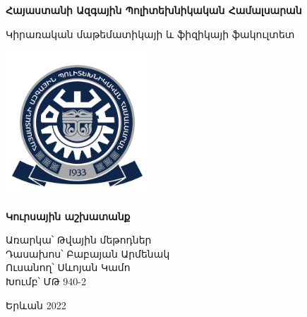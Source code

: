 \documentclass{article}
\begin{document}

\setmainfont{Arian AMU}

\begin{titlepage}
	\begin{center}
	
		\begin{LARGE}
		       \textbf{Հայաստանի Ազգային Պոլիտեխնիկական Համալսարան}
		\end{LARGE}
		
		       \vspace{0.5cm}
		
		\begin{Large}
		        Կիրառական մաթեմատիկայի և ֆիզիկայի ֆակուլտետ
		\end{Large}		            
		
		       \vspace{0.8cm}
		     
		\includegraphics[width=0.4\textwidth]{images/university}


		       \vspace{1.5cm}
		
		\begin{huge}
		       \textbf{Կուրսային  աշխատանք}
		\end{huge}


	
	\end{center}


	\vspace{4cm}

	\begin{flushleft}
	\begin{large}
		Առարկա՝    Թվային մեթոդներ\\
		Դասախոս՝  Բաբայան Արմենակ\\
		Ուսանող՝     Սևոյան Կամո\\
		Խումբ՝         ՄԹ 940-2\\
	\end{large}
	\end{flushleft}



	\vfill

	\begin{center}
		Երևան 2022
	\end{center}

\end{titlepage}
\end{document}
